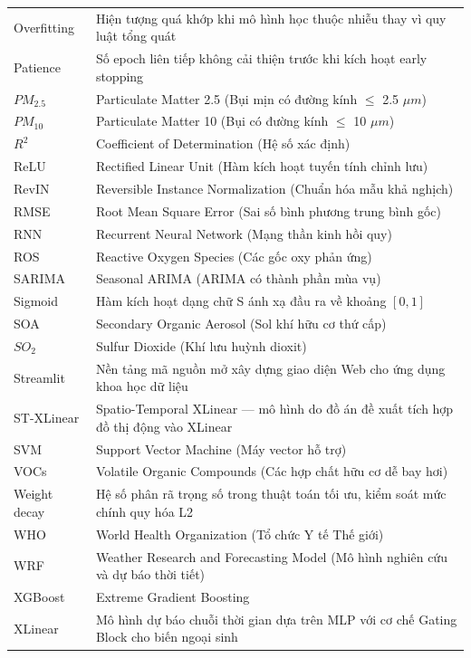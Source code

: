 \begin{center}
\begin{tabular}{p{3cm} p{11cm}}
    Overfitting & Hiện tượng quá khớp khi mô hình học thuộc nhiễu thay vì quy luật tổng quát \\
    Patience  & Số epoch liên tiếp không cải thiện trước khi kích hoạt early stopping \\
    $PM_{2.5}$  & Particulate Matter 2.5 (Bụi mịn có đường kính $\leq$ 2.5 $\mu m$) \\
    $PM_{10}$   & Particulate Matter 10 (Bụi có đường kính $\leq$ 10 $\mu m$) \\
    $R^2$     & Coefficient of Determination (Hệ số xác định) \\
    ReLU      & Rectified Linear Unit (Hàm kích hoạt tuyến tính chỉnh lưu) \\
    RevIN     & Reversible Instance Normalization (Chuẩn hóa mẫu khả nghịch) \\
    RMSE      & Root Mean Square Error (Sai số bình phương trung bình gốc) \\
    RNN       & Recurrent Neural Network (Mạng thần kinh hồi quy) \\
    ROS       & Reactive Oxygen Species (Các gốc oxy phản ứng) \\
    SARIMA    & Seasonal ARIMA (ARIMA có thành phần mùa vụ) \\
    Sigmoid   & Hàm kích hoạt dạng chữ S ánh xạ đầu ra về khoảng $[0, 1]$ \\
    SOA       & Secondary Organic Aerosol (Sol khí hữu cơ thứ cấp) \\
    $SO_2$    & Sulfur Dioxide (Khí lưu huỳnh dioxit) \\
    Streamlit & Nền tảng mã nguồn mở xây dựng giao diện Web cho ứng dụng khoa học dữ liệu \\
    ST-XLinear & Spatio-Temporal XLinear --- mô hình do đồ án đề xuất tích hợp đồ thị động vào XLinear \\
    SVM       & Support Vector Machine (Máy vector hỗ trợ) \\
    VOCs      & Volatile Organic Compounds (Các hợp chất hữu cơ dễ bay hơi) \\
    Weight decay & Hệ số phân rã trọng số trong thuật toán tối ưu, kiểm soát mức chính quy hóa L2 \\
    WHO       & World Health Organization (Tổ chức Y tế Thế giới) \\
    WRF       & Weather Research and Forecasting Model (Mô hình nghiên cứu và dự báo thời tiết) \\
    XGBoost   & Extreme Gradient Boosting \\
    XLinear   & Mô hình dự báo chuỗi thời gian dựa trên MLP với cơ chế Gating Block cho biến ngoại sinh \\
    
    \bottomrule
\end{tabular}
\end{center}
